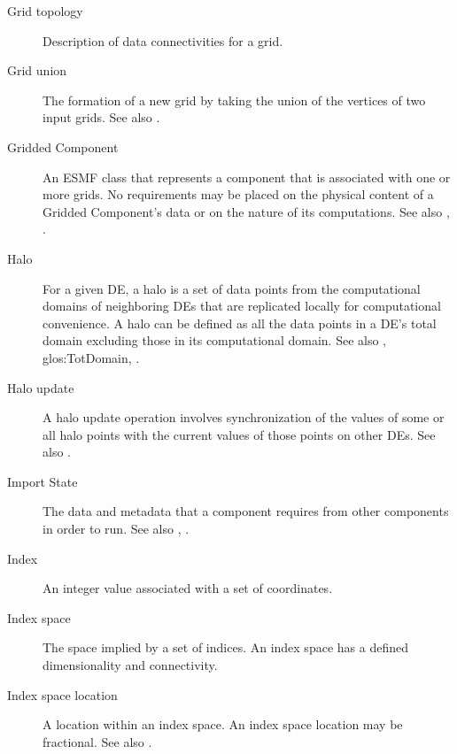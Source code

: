 \begin{description}
\label{glos:GridTopo} 
\item[Grid topology] 
  Description of data connectivities for a grid.

\label{glos:GridUnion} 
\item[Grid union] 
  The formation of a new grid
  by taking the union of the vertices of two input grids.
  See also . 

\label{glos:GridComp}
\item[Gridded Component] 
  An ESMF class that represents a component that is associated with one 
  or more grids.  No requirements 
  may be placed on the physical content of a Gridded Component's data or 
  on the nature of its computations. See also ,
  . 

\label{glos:Halo} 
\item[Halo] 
  For a given DE, a halo is a set of data points from the computational 
  domains of neighboring DEs that are replicated locally for computational
  convenience.  A halo can be defined as all the data points 
  in a DE's total domain excluding those in its computational domain. 
  See also , 
  {glos:TotDomain}, .

\label{glos:HaloUpdate}
\item[Halo update] 
  A halo update operation involves synchronization of the values of some 
  or all halo points with the current values of those points on other DEs.
  See also .

\label{glos:ImportState} 
\item[Import State] 
  The data and metadata 
  that a component requires from other components in order to run.  
  See also , .

\label{glos:Index} 
\item[Index] 
  An integer value associated with a set of coordinates.

\label{glos:IndexSpace} 
\item[Index space] 
  The space implied 
  by a set of indices.  An index space has a defined dimensionality and 
  connectivity.

\label{glos:IndexSpaceLoc} 
\item[Index space location] 
  A location within an index space.  An index space location may be fractional.
  See also .


\end{description}
